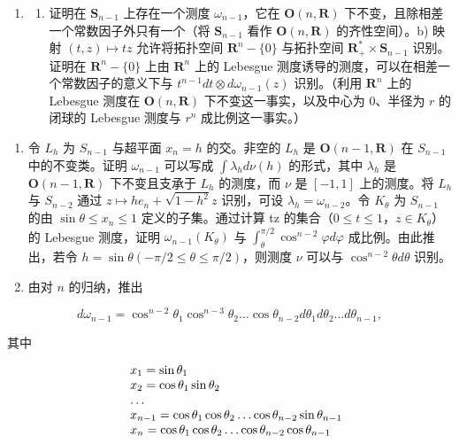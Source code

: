 \begin{enumerate}
\def\labelenumi{\arabic{enumi})}
\setcounter{enumi}{7}
\tightlist
\item
  \begin{enumerate}
  \def\labelenumii{\alph{enumii})}
  \tightlist
  \item
    证明在 \(\mathbf{S}_{n-1}\) 上存在一个测度 \(\omega_{n-1}\)，它在 \(\mathbf{O}(n,\mathbf{R})\) 下不变，且除相差一个常数因子外只有一个（将 \(\mathbf{S}_{n-1}\) 看作 \(\mathbf{O}(n,\mathbf{R})\) 的齐性空间）。b) 映射 \((t,z)\mapsto tz\) 允许将拓扑空间 \(\mathbf{R}^n -\{0\}\) 与拓扑空间 \(\mathbf{R}_+^*\times \mathbf{S}_{n-1}\) 识别。证明在 \(\mathbf{R}^n -\{0\}\) 上由 \(\mathbf{R}^n\) 上的 Lebesgue 测度诱导的测度，可以在相差一个常数因子的意义下与 \(t^{n-1}dt\otimes d\omega_{n-1}(z)\) 识别。（利用 \(\mathbf{R}^n\) 上的 Lebesgue 测度在 \(\mathbf{O}(n,\mathbf{R})\) 下不变这一事实，以及中心为 0、半径为 \(r\) 的闭球的 Lebesgue 测度与 \(r^n\) 成比例这一事实。）
  \end{enumerate}
\end{enumerate}

\begin{enumerate}
\def\labelenumi{\alph{enumi})}
\setcounter{enumi}{2}
\item
  令 \(L_{h}\) 为 \(S_{n-1}\) 与超平面 \(x_{n}=h\) 的交。非空的 \(L_{h}\) 是 \(\mathbf{O}(n-1,\mathbf{R})\) 在 \(S_{n-1}\) 中的不变类。证明 \(\omega_{n-1}\) 可以写成 \(\int\lambda_{h}d\nu(h)\) 的形式，其中 \(\lambda_{h}\) 是 \(\mathbf{O}(n-1,\mathbf{R})\) 下不变且支承于 \(L_{h}\) 的测度，而 \(\nu\) 是 \([-1,1]\) 上的测度。将 \(L_{h}\) 与 \(S_{n-2}\) 通过 \(z\mapsto he_{n}+\sqrt{1-h^{2}}z\) 识别，可设 \(\lambda_{h}=\omega_{n-2}\)。令 \(K_{\theta}\) 为 \(S_{n-1}\) 的由 \(\sin\theta\leqslant x_{n}\leqslant1\) 定义的子集。通过计算 tz 的集合（\(0\leqslant t\leqslant1\)，\(z\in K_{\theta}\)）的 Lebesgue 测度，证明 \(\omega_{n-1}(K_{\theta})\) 与 \(\int_{\theta}^{\pi/2}\cos^{n-2}\varphi d\varphi\) 成比例。由此推出，若令 \(h=\sin\theta(-\pi/2\leqslant\theta\leqslant\pi/2)\)，则测度 \(\nu\) 可以与 \(\cos^{n-2}\theta d\theta\) 识别。
\item
  由对 \(n\) 的归纳，推出
\end{enumerate}

\[
d \omega_ {n - 1} = \cos^ {n - 2} \theta_ {1} \cos^ {n - 3} \theta_ {2} \dots \cos \theta_ {n - 2} d \theta_ {1} d \theta_ {2} \dots d \theta_ {n - 1},
\]

 其中

\[
\begin{array}{r l} & x _ {1} = \sin \theta_ {1} \\ & x _ {2} = \cos \theta_ {1} \sin \theta_ {2} \\ & \dots \\ & x _ {n - 1} = \cos \theta_ {1} \cos \theta_ {2} \dots \cos \theta_ {n - 2} \sin \theta_ {n - 1} \\ & x _ {n} = \cos \theta_ {1} \cos \theta_ {2} \dots \cos \theta_ {n - 2} \cos \theta_ {n - 1} \end{array}
\]

